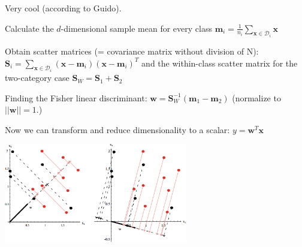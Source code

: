  \begin{minipage}{10.5cm}
  Very cool (according to Guido).
    \begin{aufzaehlung}
      \item Calculate the $d$-dimensional sample mean for every class
        $\bm{m}_i = \frac{1}{n_i} \sum\limits_{\bm{x} \in \mathcal{D}_i} \bm{x}$
      \item Obtain scatter matrices (= covariance matrix without division of N):
        $\bm{S}_i = \sum\limits_{\bm{x} \in \mathcal{D}_i} 
        (\bm{x}-\bm{m}_i) (\bm{x}-\bm{m}_i)^T$
        and the within-class scatter matrix for the two-category case
        $\bm{S}_W = \bm{S}_1 + \bm{S}_2$
      \item Finding the Fisher linear discriminant:
        $\bm{w} = \bm{S}_W^{-1} (\bm{m}_1 - \bm{m}_2)$
        (normalize to$||\bm{w}||=1$.)
      \item Now we can transform and reduce dimensionality to a scalar:
        $y = \bm{w}^T \bm{x}$
    \end{aufzaehlung}
  \end{minipage}\hspace{5mm}
  \begin{minipage}{8cm}
    \includegraphics[width=8cm]{./images/fisher_discriminant.png}
  \end{minipage}
  
